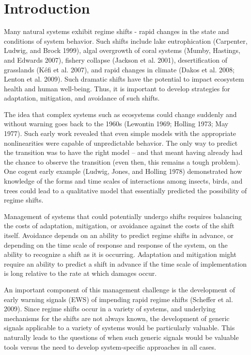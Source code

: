 \documentclass[author-year, review]{elsarticle} %
\begin{document}
\section{Introduction}

Many natural systems exhibit regime shifts - rapid changes in the state
and conditions of system behavior. Such shifts include lake
eutrophication (Carpenter, Ludwig, and Brock 1999), algal overgrowth of
coral systems (Mumby, Hastings, and Edwards 2007), fishery collapse
(Jackson et al. 2001), desertification of grasslands (Kéfi et al. 2007),
and rapid changes in climate (Dakos et al. 2008; Lenton et al. 2009).
Such dramatic shifts have the potential to impact ecosystem health and
human well-being. Thus, it is important to develop strategies for
adaptation, mitigation, and avoidance of such shifts.

The idea that complex systems such as ecosystems could change suddenly
and without warning goes back to the 1960s (Lewontin 1969; Holling 1973;
May 1977). Such early work revealed that even simple models with the
appropriate nonlinearities were capable of unpredictable behavior. The
only way to predict the transition was to have the right model -- and
that meant having already had the chance to observe the transition (even
then, this remains a tough problem). One cogent early example (Ludwig,
Jones, and Holling 1978) demonstrated how knowledge of the forms and
time scales of interactions among insects, birds, and trees could lead
to a qualitative model that essentially predicted the possibility of
regime shifts.

Management of systems that could potentially undergo shifts requires
balancing the costs of adaptation, mitigation, or avoidance against the
costs of the shift itself. Avoidance depends on an ability to predict
regime shifts in advance, or depending on the time scale of response and
response of the system, on the ability to recognize a shift as it is
occurring. Adaptation and mitigation might require an ability to predict
a shift in advance if the time scale of implementation is long relative
to the rate at which damages occur.

An important component of this management challenge is the development
of early warning signals (EWS) of impending rapid regime shifts
(Scheffer et al. 2009). Since regime shifts occur in a variety of
systems, and underlying mechanisms for the shifts are not always known,
the development of generic signals applicable to a variety of systems
would be particularly valuable. This naturally leads to the questions of
when such generic signals would be valuable tools versus the need to
develop system-specific approaches in all cases.
\end{document}

